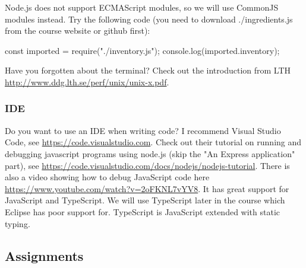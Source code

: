 \documentclass[fleqn, article, a4paper]{memoir}
\begin{document}
\noindent Node.js does not support ECMAScript modules, so we will use CommonJS modules instead. Try the following code (you need to download ./ingredients.js from the course website or github first):
\begin{Code}
  const imported = require("./inventory.js");
  console.log(imported.inventory);
\end{Code}

\noindent Have you forgotten about the terminal? Check out the introduction from LTH \url{http://www.ddg.lth.se/perf/unix/unix-x.pdf}.

\subsubsection*{IDE}

\noindent Do you want to use an IDE when writing code? I recommend Visual Studio Code, see \url{https://code.visualstudio.com}. Check out their tutorial on running and debugging javascript programs using node.js (skip the "An Express application" part), see \url{https://code.visualstudio.com/docs/nodejs/nodejs-tutorial}. There is also a video showing how to debug JavaScript code here \url{https://www.youtube.com/watch?v=2oFKNL7vYV8}. It has great support for JavaScript and TypeScript. We will use TypeScript later in the course which Eclipse has poor support for. TypeScript is JavaScript extended with static typing.

\subsection*{Assignments}
\end{document}
